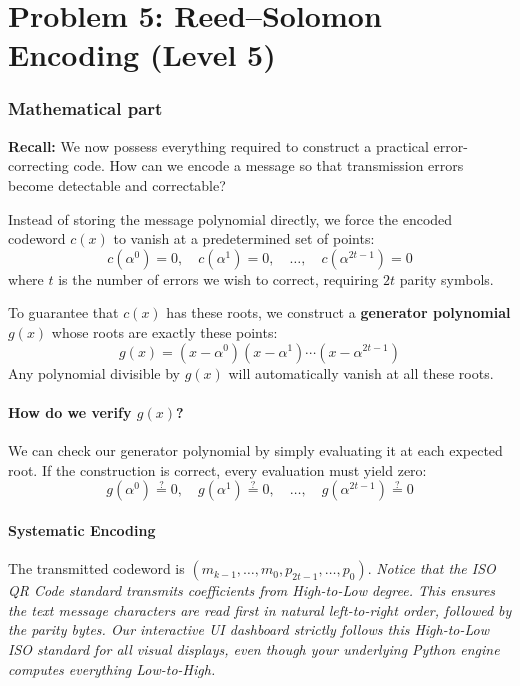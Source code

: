 \section*{Problem 5: Reed--Solomon Encoding (Level 5)}

\subsubsection*{Mathematical part}
\textbf{Recall:} We now possess everything required to construct a practical error-correcting code. How can we encode a message so that transmission errors become detectable and correctable?

Instead of storing the message polynomial directly, we force the encoded codeword $c(x)$ to vanish at a predetermined set of points:
\[
c(\alpha^0)=0, \quad c(\alpha^1)=0, \quad \ldots, \quad c(\alpha^{2t-1})=0
\]
where $t$ is the number of errors we wish to correct, requiring $2t$ parity symbols.

To guarantee that $c(x)$ has these roots, we construct a \textbf{generator polynomial} $g(x)$ whose roots are exactly these points:
\[
g(x) = (x-\alpha^0)(x-\alpha^1)\cdots(x-\alpha^{2t-1})
\]
Any polynomial divisible by $g(x)$ will automatically vanish at all these roots.

\paragraph{How do we verify $g(x)$?} We can check our generator polynomial by simply evaluating it at each expected root. If the construction is correct, every evaluation must yield zero:
\[
g(\alpha^0) \stackrel{?}{=} 0, \quad g(\alpha^1) \stackrel{?}{=} 0, \quad \ldots, \quad g(\alpha^{2t-1}) \stackrel{?}{=} 0
\]

\paragraph{Systematic Encoding}

The transmitted codeword is $(m_{k-1}, \ldots, m_0, p_{2t-1}, \ldots, p_0)$. \textit{Notice that the ISO QR Code standard transmits coefficients from High-to-Low degree. This ensures the text message characters are read first in natural left-to-right order, followed by the parity bytes. Our interactive UI dashboard strictly follows this High-to-Low ISO standard for all visual displays, even though your underlying Python engine computes everything Low-to-High.}

